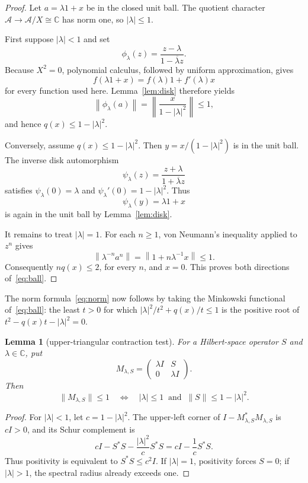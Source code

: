 \documentclass[11pt]{article}
\newtheorem{lemma}[theorem]{Lemma}
\newcommand{\A}{\mathcal A}
\newcommand{\C}{\mathbb C}
\begin{document}
\begin{proof}
Let $a=\lambda1+x$ be in the closed unit ball.  The quotient character
$\A\to\A/X\cong\C$ has norm one, so $|\lambda|\leq1$.

First suppose $|\lambda|<1$ and set
\[
  \phi_\lambda(z)=\frac{z-\lambda}{1-\overline\lambda z}.
\]
Because $X^2=0$, polynomial calculus, followed by uniform approximation,
gives
\[
 f(\lambda1+x)=f(\lambda)1+f'(\lambda)x
\]
for every function used here.  Lemma~\ref{lem:disk} therefore yields
\[
 \left\|\phi_\lambda(a)\right\|
 =\left\|\frac{x}{1-|\lambda|^2}\right\|\leq1,
\]
and hence $q(x)\leq1-|\lambda|^2$.

Conversely, assume $q(x)\leq1-|\lambda|^2$.  Then
$y=x/(1-|\lambda|^2)$ is in the unit ball.  The inverse disk automorphism
\[
  \psi_\lambda(z)=\frac{z+\lambda}{1+\overline\lambda z}
\]
satisfies $\psi_\lambda(0)=\lambda$ and
$\psi_\lambda'(0)=1-|\lambda|^2$.  Thus
\[
  \psi_\lambda(y)=\lambda1+x
\]
is again in the unit ball by Lemma~\ref{lem:disk}.

It remains to treat $|\lambda|=1$.  For each $n\geq1$, von Neumann's
inequality applied to $z^n$ gives
\[
  \left\|\lambda^{-n}a^n\right\|
  =\left\|1+n\lambda^{-1}x\right\|\leq1.
\]
Consequently $nq(x)\leq2$, for every $n$, and $x=0$.  This proves both
directions of~\eqref{eq:ball}.
\end{proof}

The norm formula~\eqref{eq:norm} now follows by taking the Minkowski
functional of~\eqref{eq:ball}: the least $t>0$ for which
$|\lambda|^2/t^2+q(x)/t\leq1$ is the positive root of
$t^2-q(x)t-|\lambda|^2=0$.

\begin{lemma}[upper-triangular contraction test]\label{lem:block}
For a Hilbert-space operator $S$ and $\lambda\in\C$, put
\[
 M_{\lambda,S}=\begin{pmatrix}\lambda I&S\\0&\lambda I\end{pmatrix}.
\]
Then
\[
 \|M_{\lambda,S}\|\leq1
 \quad\Longleftrightarrow\quad
 |\lambda|\leq1\ \text{ and }\ \|S\|\leq1-|\lambda|^2.
\]
\end{lemma}

\begin{proof}
For $|\lambda|<1$, let $c=1-|\lambda|^2$.  The upper-left corner of
$I-M_{\lambda,S}^*M_{\lambda,S}$ is $cI>0$, and its Schur complement is
\[
 cI-S^*S-\frac{|\lambda|^2}{c}S^*S
 =cI-\frac1cS^*S.
\]
Thus positivity is equivalent to $S^*S\leq c^2I$.  If $|\lambda|=1$,
positivity forces $S=0$; if $|\lambda|>1$, the spectral radius already exceeds
one.
\end{proof}
\end{document}
